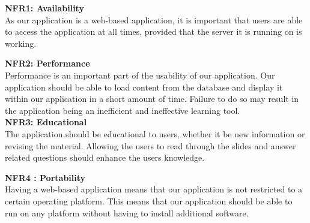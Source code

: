 \documentclass{l3proj}
\begin{document}
\textbf{ NFR1: Availability}\\
As our application is a web-based application, it is important that users are able to access the application at all times, provided that the server it is running on is working.

\textbf{NFR2: Performance}\\
Performance is an important part of the usability of our application. Our application should be able to load content from the database and display it within our application in a short amount of time. Failure to do so may result in the application being an inefficient and ineffective learning tool.\\

\textbf{ NFR3: Educational}\\
The application should be educational to users, whether it be new information or revising the material. Allowing the users to read through the slides and answer related questions should enhance the users knowledge.

\textbf{ NFR4 : Portability}\\
Having a web-based application means that our application is not restricted to a certain operating platform. This means that our application should be able to run on any platform without having to install additional software.
\end{document}
